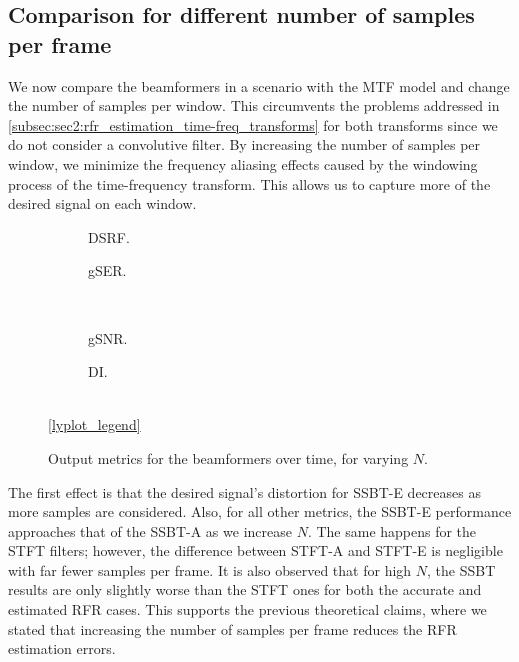 
\subsection{Comparison for different number of samples per frame}

We now compare the beamformers in a scenario with the MTF model and change the number of samples per window. This circumvents the problems addressed in \cref{subsec:sec2:rfr_estimation_time-freq_transforms} for both transforms since we do not consider a convolutive filter. By increasing the number of samples per window, we minimize the frequency aliasing effects caused by the windowing process of the time-frequency transform. This allows us to capture more of the desired signal on each window.
\begin{figure}[!t]
	\centering
	\begin{subfigure}{0.49\textwidth}
		\centering
		
		\caption{DSRF.}
		\label{subfig:lineplot__DSRF__N_var__iSER_n15__Ly_1}
	\end{subfigure}\hfill
	\begin{subfigure}{0.49\textwidth}
		\centering
		
		\caption{gSER.}
		\label{subfig:lineplot__gSER__N_var__iSER_n15__Ly_1}
	\end{subfigure}\\[1em]
	\begin{subfigure}{0.49\textwidth}
		\centering
		
		\caption{gSNR.}
		\label{subfig:lineplot__gSNR__N_var__iSER_n15__Ly_1}
	\end{subfigure}\hfill
	\begin{subfigure}{0.49\textwidth}
		\centering
		
		\caption{DI.}
		\label{subfig:lineplot__DI__N_var__iSER_n15__Ly_1}
	\end{subfigure}\\[1em]
	\ref*{lyplot_legend}
	\caption{Output metrics for the beamformers over time, for varying $N$.}
	\label{fig:lineplot__N_var__iSER_n15__Ly_1}
\end{figure}

The first effect is that the desired signal's distortion for SSBT-E decreases as more samples are considered. Also, for all other metrics, the SSBT-E performance approaches that of the SSBT-A as we increase $N$. The same happens for the STFT filters; however, the difference between STFT-A and STFT-E is negligible with far fewer samples per frame. It is also observed that for high $N$, the SSBT results are only slightly worse than the STFT ones for both the accurate and estimated RFR cases. This supports the previous theoretical claims, where we stated that increasing the number of samples per frame reduces the RFR estimation errors.

